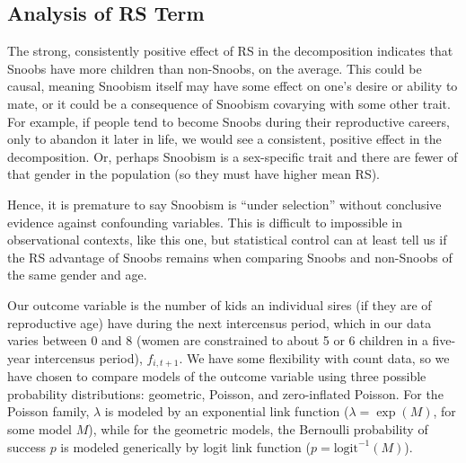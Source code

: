 \subsection{Analysis of RS Term}

The strong, consistently positive effect of RS in the decomposition indicates that Snoobs have more children than non-Snoobs, on the average.  This could be causal, meaning Snoobism itself may have some effect on one's desire or ability to mate, or it could be a consequence of Snoobism covarying with some other trait.  For example, if people tend to become Snoobs during their reproductive careers, only to abandon it later in life, we would see a consistent, positive effect in the decomposition.  Or, perhaps Snoobism is a sex-specific trait and there are fewer of that gender in the population (so they must have higher mean RS).  

Hence, it is premature to say Snoobism is ``under selection'' without conclusive evidence against confounding variables.  This is difficult to impossible in observational contexts, like this one, but statistical control can at least tell us if the RS advantage of Snoobs remains when comparing Snoobs and non-Snoobs of the same gender and age.  

Our outcome variable is the number of kids an individual sires (if they are of reproductive age) have during the next intercensus period, which in our data varies between 0 and 8 (women are constrained to about 5 or 6 children in a five-year intercensus period), $f_{i, t+1}$.  We have some flexibility with count data, so we have chosen to compare models of the outcome variable using three possible probability distributions: geometric, Poisson, and zero-inflated Poisson.  For the Poisson family, $\lambda$ is modeled by an exponential link function ($\lambda = \exp(M)$, for some model $M$), while for the geometric models, the Bernoulli probability of success $p$ is modeled generically by logit link function ($p=\mathrm{logit}^{-1}(M)$).  

